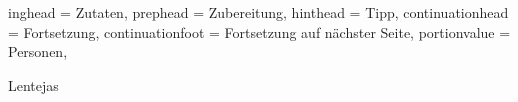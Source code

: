 \begin{otherlanguage}{ngerman}

\setHeadlines
{%
    inghead = Zutaten,
    prephead = Zubereitung,
    hinthead = Tipp,
    continuationhead = Fortsetzung,
    continuationfoot = Fortsetzung auf n\"achster Seite,
    portionvalue = Personen,
}

\begin{recipe}
[ %
    preparationtime = {\unit[20]{Minuten}},
    portion = {\portion{2}},
    source = Unkown
]
{Lentejas}
    \graph
    {%
    }
    \ingredients
    {%
    }


    \hint
    {%
    }

\end{recipe}

\end{otherlanguage}
